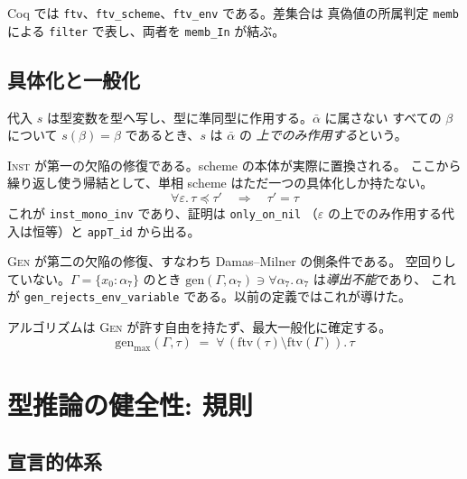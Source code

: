 \documentclass[11pt,a4paper]{ltjsarticle}
\newcommand{\ftv}{\mathrm{ftv}}
\newcommand{\gen}{\mathrm{gen}}
\newcommand{\genmax}{\mathrm{gen}_{\max}}
\newcommand{\inst}{\preceq}
\begin{document}
Coq では \texttt{ftv}、\texttt{ftv\_scheme}、\texttt{ftv\_env} である。差集合は
真偽値の所属判定 \texttt{memb} による \texttt{filter} で表し、両者を
\texttt{memb\_In} が結ぶ。

\subsection{具体化と一般化}

代入 $s$ は型変数を型へ写し、型に準同型に作用する。$\bar\alpha$ に属さない
すべての $\beta$ について $s(\beta) = \beta$ であるとき、$s$ は $\bar\alpha$ の
\emph{上でのみ作用する}という。


\textsc{Inst} が第一の欠陥の修復である。scheme の本体が実際に置換される。
ここから繰り返し使う帰結として、単相 scheme はただ一つの具体化しか持たない。
\[
  \forall\varepsilon.\,\tau \inst \tau'
  \quad\Longrightarrow\quad
  \tau' = \tau
\]
これが \texttt{inst\_mono\_inv} であり、証明は \texttt{only\_on\_nil}
（$\varepsilon$ の上でのみ作用する代入は恒等）と \texttt{appT\_id} から出る。

\textsc{Gen} が第二の欠陥の修復、すなわち Damas--Milner の側条件である。
空回りしていない。$\Gamma = \{x_0 : \alpha_7\}$ のとき
$\gen(\Gamma, \alpha_7) \ni \forall\alpha_7.\,\alpha_7$ は\emph{導出不能}であり、
これが \texttt{gen\_rejects\_env\_variable} である。以前の定義ではこれが導けた。

アルゴリズムは \textsc{Gen} が許す自由を持たず、最大一般化に確定する。
\[
  \genmax(\Gamma,\tau) \;=\; \forall\,(\ftv(\tau) \setminus \ftv(\Gamma)).\,\tau
\]

\section{型推論の健全性: 規則}

\subsection{宣言的体系}
\end{document}
